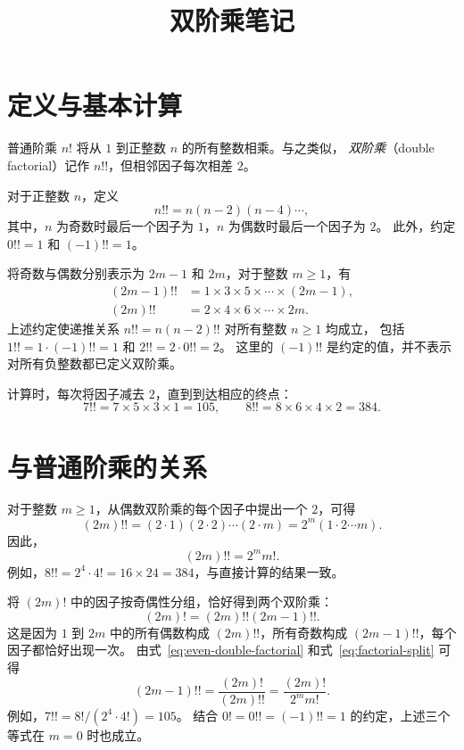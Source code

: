 \documentclass[UTF8,12pt,a4paper,fontset=fandol]{ctexart}
\title{双阶乘笔记}
\author{}
\date{}
\begin{document}
\maketitle

\section{定义与基本计算}

普通阶乘 $n!$ 将从 $1$ 到正整数 $n$ 的所有整数相乘。与之类似，
\emph{双阶乘}（double factorial）记作 $n!!$，但相邻因子每次相差 $2$。

\begin{definition}[双阶乘]
对于正整数 $n$，定义
\[
  n!!=n(n-2)(n-4)\cdots,
\]
其中，$n$ 为奇数时最后一个因子为 $1$，$n$ 为偶数时最后一个因子为 $2$。
此外，约定 $0!!=1$ 和 $(-1)!!=1$。
\end{definition}

将奇数与偶数分别表示为 $2m-1$ 和 $2m$，对于整数 $m\geq 1$，有
\begin{align*}
  (2m-1)!!&=1\times3\times5\times\cdots\times(2m-1),\\
  (2m)!!&=2\times4\times6\times\cdots\times2m.
\end{align*}
上述约定使递推关系 $n!!=n(n-2)!!$ 对所有整数 $n\geq1$ 均成立，
包括 $1!!=1\cdot(-1)!!=1$ 和 $2!!=2\cdot0!!=2$。
这里的 $(-1)!!$ 是约定的值，并不表示对所有负整数都已定义双阶乘。

\begin{example}[奇数与偶数的双阶乘]
计算时，每次将因子减去 $2$，直到到达相应的终点：
\[
  7!!=7\times5\times3\times1=105,\qquad
  8!!=8\times6\times4\times2=384.
\]
\end{example}

\section{与普通阶乘的关系}

对于整数 $m\geq1$，从偶数双阶乘的每个因子中提出一个 $2$，可得
\[
  (2m)!!=(2\cdot1)(2\cdot2)\cdots(2\cdot m)
  =2^m(1\cdot2\cdots m).
\]
因此，
\begin{equation}\label{eq:even-double-factorial}
  (2m)!!=2^m m!.
\end{equation}
例如，$8!!=2^4\cdot4!=16\times24=384$，与直接计算的结果一致。

将 $(2m)!$ 中的因子按奇偶性分组，恰好得到两个双阶乘：
\begin{equation}\label{eq:factorial-split}
  (2m)!=(2m)!!(2m-1)!!.
\end{equation}
这是因为 $1$ 到 $2m$ 中的所有偶数构成 $(2m)!!$，所有奇数构成
$(2m-1)!!$，每个因子都恰好出现一次。
由式~\eqref{eq:even-double-factorial} 和式~\eqref{eq:factorial-split} 可得
\begin{equation}\label{eq:odd-double-factorial}
  (2m-1)!!=\frac{(2m)!}{(2m)!!}=\frac{(2m)!}{2^m m!}.
\end{equation}
例如，$7!!=8!/(2^4\cdot4!)=105$。
结合 $0!=0!!=(-1)!!=1$ 的约定，上述三个等式在 $m=0$ 时也成立。
\end{document}
